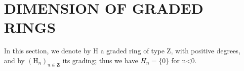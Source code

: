 \section{DIMENSION OF GRADED RINGS}

In this section, we denote by H a graded ring of type Z, with positive degrees, and by \((\mathrm{H}_{n})_{n\in\mathbf{Z}}\) its grading; thus we have \(H_{n}=\{0\}\) for n\textless0.

